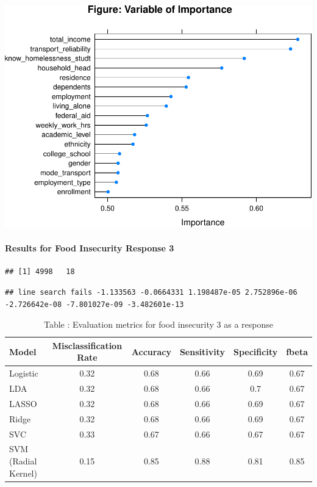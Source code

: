 \documentclass[
  10pt,
]{article}
\begin{document}
\includegraphics{phase1_report_files/figure-latex/unnamed-chunk-12-1}

\hypertarget{results-for-food-insecurity-response-3}{%
\paragraph{Results for Food Insecurity Response 3}\label{results-for-food-insecurity-response-3}}

\begin{verbatim}
## [1] 4998   18
\end{verbatim}

\begin{verbatim}
## line search fails -1.133563 -0.0664331 1.198487e-05 2.752896e-06 -2.726642e-08 -7.801027e-09 -3.482601e-13
\end{verbatim}

\begin{table}[H]

\caption{\label{tab:unnamed-chunk-13}Table : Evaluation metrics for  food insecurity 3 as a response}
\centering
\fontsize{12}{14}\selectfont
\begin{tabular}[t]{l|c|c|c|c|c}
\hline
Model & Misclassification Rate & Accuracy & Sensitivity & Specificity & fbeta\\
\hline
Logistic & 0.32 & 0.68 & 0.66 & 0.69 & 0.67\\
\hline
LDA & 0.32 & 0.68 & 0.66 & 0.7 & 0.67\\
\hline
LASSO & 0.32 & 0.68 & 0.66 & 0.69 & 0.67\\
\hline
Ridge & 0.32 & 0.68 & 0.66 & 0.69 & 0.67\\
\hline
SVC & 0.33 & 0.67 & 0.66 & 0.67 & 0.67\\
\hline
SVM (Radial Kernel) & 0.15 & 0.85 & 0.88 & 0.81 & 0.85\\
\hline
\end{tabular}
\end{table}
\end{document}
